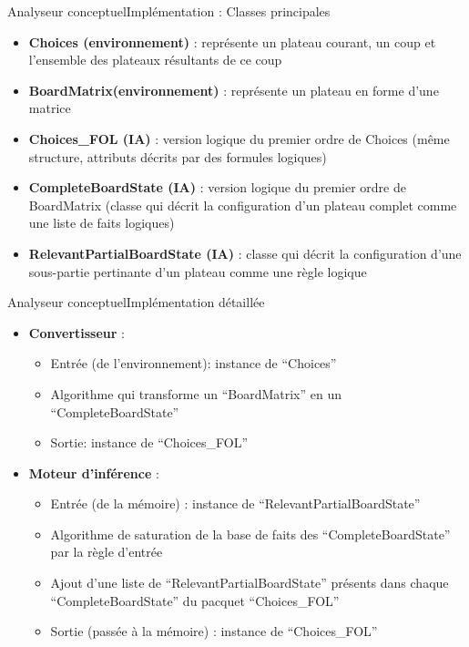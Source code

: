 \begin{frame}{Analyseur conceptuel}{Implémentation : Classes principales}
\begin{itemize}
  \item \textbf {Choices (environnement)} : représente un plateau
  courant, un coup et l'ensemble des plateaux résultants de ce coup
  \item \textbf {BoardMatrix(environnement)} : représente un plateau en forme
  d'une matrice
  \item \textbf {Choices\_FOL (IA)} : version logique du premier ordre de
  Choices (même structure, attributs décrits par des formules logiques)
  \item \textbf {CompleteBoardState (IA)} : version logique du premier ordre de
  BoardMatrix (classe qui décrit la configuration
  d'un plateau complet comme une liste de faits logiques)
  \item \textbf {RelevantPartialBoardState (IA)} : classe qui décrit la
  configuration d'une sous-partie pertinante d'un plateau comme une règle
  logique
\end{itemize}
\end{frame}


\begin{frame}{Analyseur conceptuel}{Implémentation détaillée}
\begin{itemize}
  \item \textbf {Convertisseur} :
  \begin{itemize}
    \item Entrée (de l'environnement): instance de \enquote{Choices}
    \item Algorithme qui transforme un \enquote{BoardMatrix} en un
    \enquote{CompleteBoardState}
    \item Sortie: instance de
    \enquote{Choices\_FOL}
  \end{itemize}
  \item \textbf {Moteur d'inférence} :
  \begin{itemize}
    \item Entrée (de la mémoire) : instance de
    \enquote{RelevantPartialBoardState}
    \item Algorithme de saturation de la base de faits des
    \enquote{CompleteBoardState} par la règle d'entrée
    \item Ajout d'une liste de \enquote{RelevantPartialBoardState} présents dans
    chaque \enquote{CompleteBoardState} du pacquet \enquote{Choices\_FOL}
    \item Sortie (passée à la mémoire) : instance de
    \enquote{Choices\_FOL}
  \end{itemize}
\end{itemize}
\end{frame}
